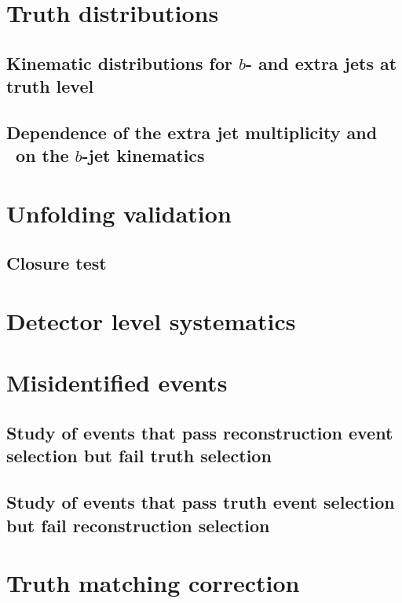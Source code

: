 \documentclass[12pt]{ucbthesis}
\begin{document}
\section{Truth distributions}
\subsection{Kinematic distributions for $b$- and extra jets at truth level}
\label{app:truth}

\subsection{Dependence of the extra jet multiplicity and \pt\ on the $b$-jet kinematics}
\label{app:bpt}

\section{Unfolding validation}
\label{app:unfoldval}

\subsection{Closure test}
\label{app:unfoldpull}




\section{Detector level systematics}
\label{app:sys}

\section{Misidentified events}
\subsection{Study of  events that pass reconstruction event selection but fail truth selection}
\label{app:reconottruth}

\subsection{Study of events that pass truth event selection but fail reconstruction selection}
\label{app:truthnotreco}

\section{Truth matching correction}
\label{app:tcorr}

\end{document}
